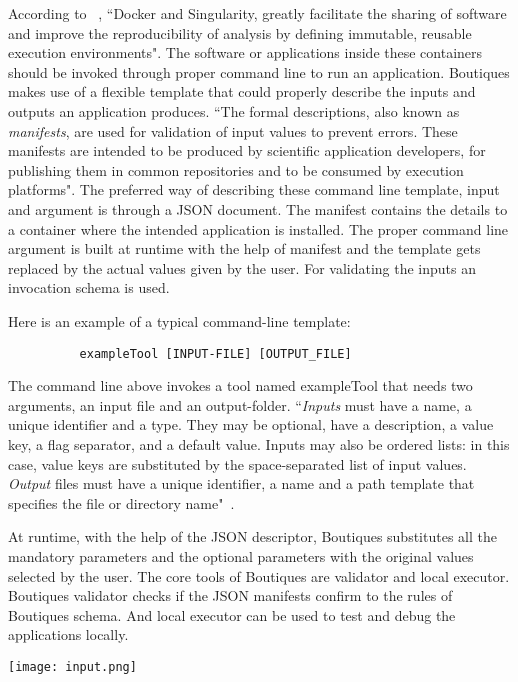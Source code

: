 According to ~\cite{boutiques}, ``Docker and Singularity, greatly facilitate the sharing of software and improve the reproducibility of analysis by defining immutable, reusable execution environments". The software or applications inside these containers should be invoked through proper command line to run an application. Boutiques makes use of a flexible template that could properly describe the inputs and outputs an application produces. ``The formal descriptions, also known as \textit{manifests}, are used for validation of input values to prevent errors. These manifests are intended to be produced by scientific application developers, for publishing them in common repositories and to be consumed by execution platforms". The preferred way of describing these command line template, input and argument is through a JSON document. The manifest contains the details to a container where the intended application is installed. The proper command line argument is built at runtime with the help of manifest and the template gets replaced by the actual values given by the user. For validating the inputs an invocation schema is used.

Here is an example of a typical command-line template:

\begin{verbatim}
          exampleTool [INPUT-FILE] [OUTPUT_FILE]
\end{verbatim}

The command line above invokes a tool named exampleTool that needs two arguments, an input file and an output-folder. ``\textit{Inputs} must have a name, a unique identifier and a type. They may be optional, have a description, a value key, a flag separator, and a default value. Inputs may also be ordered lists: in this case, value keys are substituted by the space-separated list of input values. \textit{Output} files must have a unique identifier, a name and a path template that specifies the file or directory name"~\cite{boutiques}.

At runtime, with the help of the JSON descriptor, Boutiques substitutes all the mandatory parameters and the optional parameters with the original values selected by the user. The core tools of Boutiques are validator and local executor. Boutiques validator checks if the JSON manifests confirm to the rules of Boutiques schema. And local executor can be used to test and debug the applications locally.

\begin{center}
\texttt{[image: input.png]}
\label{fig:input}
\end{center}

